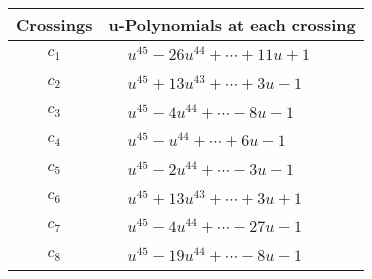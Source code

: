 \documentclass[1p]{elsarticle_modified}
\theoremstyle{definition}
\begin{document}
\begin{tabular}{m{50pt}|m{274pt}}
Crossings & \hspace{64pt}u-Polynomials at each crossing \\
\hline $$\begin{aligned}c_{1}\end{aligned}$$&$\begin{aligned}
&u^{45}-26 u^{44}+\cdots+11 u+1
\end{aligned}$\\
\hline $$\begin{aligned}c_{2}\end{aligned}$$&$\begin{aligned}
&u^{45}+13 u^{43}+\cdots+3 u-1
\end{aligned}$\\
\hline $$\begin{aligned}c_{3}\end{aligned}$$&$\begin{aligned}
&u^{45}-4 u^{44}+\cdots-8 u-1
\end{aligned}$\\
\hline $$\begin{aligned}c_{4}\end{aligned}$$&$\begin{aligned}
&u^{45}- u^{44}+\cdots+6 u-1
\end{aligned}$\\
\hline $$\begin{aligned}c_{5}\end{aligned}$$&$\begin{aligned}
&u^{45}-2 u^{44}+\cdots-3 u-1
\end{aligned}$\\
\hline $$\begin{aligned}c_{6}\end{aligned}$$&$\begin{aligned}
&u^{45}+13 u^{43}+\cdots+3 u+1
\end{aligned}$\\
\hline $$\begin{aligned}c_{7}\end{aligned}$$&$\begin{aligned}
&u^{45}-4 u^{44}+\cdots-27 u-1
\end{aligned}$\\
\hline $$\begin{aligned}c_{8}\end{aligned}$$&$\begin{aligned}
&u^{45}-19 u^{44}+\cdots-8 u-1
\end{aligned}$\\

\end{tabular}
\end{document}
